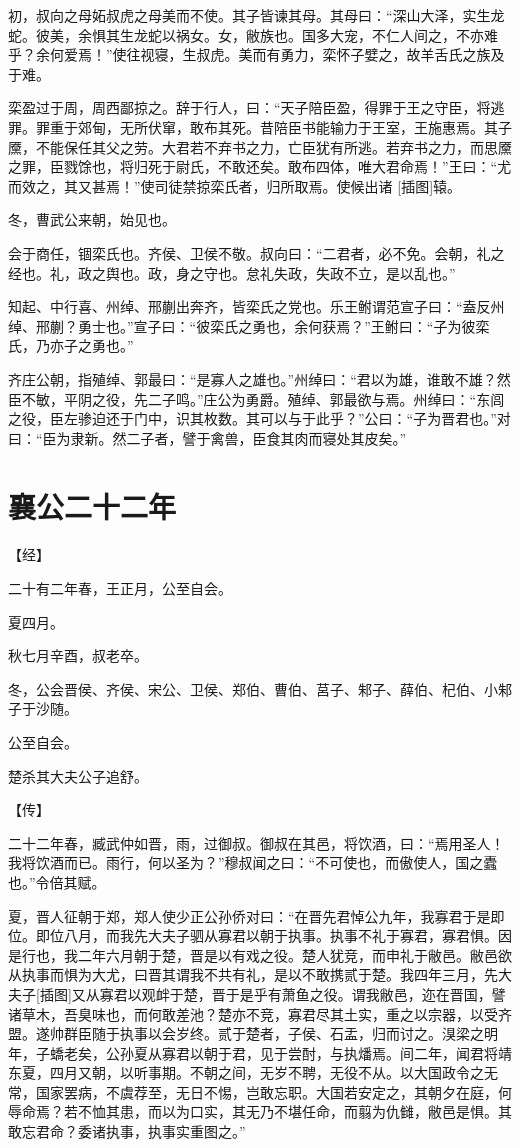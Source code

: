 \documentclass[a4paper,12pt,UTF8,twoside]{ctexbook}
\begin{document}
初，叔向之母妬叔虎之母美而不使。其子皆谏其母。其母曰：“深山大泽，实生龙蛇。彼美，余惧其生龙蛇以祸女。女，敝族也。国多大宠，不仁人间之，不亦难乎？余何爱焉！”使往视寝，生叔虎。美而有勇力，栾怀子嬖之，故羊舌氏之族及于难。

栾盈过于周，周西鄙掠之。辞于行人，曰：“天子陪臣盈，得罪于王之守臣，将逃罪。罪重于郊甸，无所伏窜，敢布其死。昔陪臣书能输力于王室，王施惠焉。其子黡，不能保任其父之劳。大君若不弃书之力，亡臣犹有所逃。若弃书之力，而思黡之罪，臣戮馀也，将归死于尉氏，不敢还矣。敢布四体，唯大君命焉！”王曰：“尤而效之，其又甚焉！”使司徒禁掠栾氏者，归所取焉。使候出诸 [插图]辕。

冬，曹武公来朝，始见也。

会于商任，锢栾氏也。齐侯、卫侯不敬。叔向曰：“二君者，必不免。会朝，礼之经也。礼，政之舆也。政，身之守也。怠礼失政，失政不立，是以乱也。”

知起、中行喜、州绰、邢蒯出奔齐，皆栾氏之党也。乐王鲋谓范宣子曰：“盍反州绰、邢蒯？勇士也。”宣子曰：“彼栾氏之勇也，余何获焉？”王鲋曰：“子为彼栾氏，乃亦子之勇也。”

齐庄公朝，指殖绰、郭最曰：“是寡人之雄也。”州绰曰：“君以为雄，谁敢不雄？然臣不敏，平阴之役，先二子鸣。”庄公为勇爵。殖绰、郭最欲与焉。州绰曰：“东闾之役，臣左骖迫还于门中，识其枚数。其可以与于此乎？”公曰：“子为晋君也。”对曰：“臣为隶新。然二子者，譬于禽兽，臣食其肉而寝处其皮矣。”

\chapter{襄公二十二年}



【经】

二十有二年春，王正月，公至自会。

夏四月。

秋七月辛酉，叔老卒。

冬，公会晋侯、齐侯、宋公、卫侯、郑伯、曹伯、莒子、邾子、薛伯、杞伯、小邾子于沙随。

公至自会。

楚杀其大夫公子追舒。

【传】

二十二年春，臧武仲如晋，雨，过御叔。御叔在其邑，将饮酒，曰：“焉用圣人！我将饮酒而已。雨行，何以圣为？”穆叔闻之曰：“不可使也，而傲使人，国之蠹也。”令倍其赋。

夏，晋人征朝于郑，郑人使少正公孙侨对曰：“在晋先君悼公九年，我寡君于是即位。即位八月，而我先大夫子驷从寡君以朝于执事。执事不礼于寡君，寡君惧。因是行也，我二年六月朝于楚，晋是以有戏之役。楚人犹竞，而申礼于敝邑。敝邑欲从执事而惧为大尤，曰晋其谓我不共有礼，是以不敢携贰于楚。我四年三月，先大夫子[插图]又从寡君以观衅于楚，晋于是乎有萧鱼之役。谓我敝邑，迩在晋国，譬诸草木，吾臭味也，而何敢差池？楚亦不竞，寡君尽其土实，重之以宗器，以受齐盟。遂帅群臣随于执事以会岁终。贰于楚者，子侯、石盂，归而讨之。湨梁之明年，子蟜老矣，公孙夏从寡君以朝于君，见于尝酎，与执燔焉。间二年，闻君将靖东夏，四月又朝，以听事期。不朝之间，无岁不聘，无役不从。以大国政令之无常，国家罢病，不虞荐至，无日不惕，岂敢忘职。大国若安定之，其朝夕在庭，何辱命焉？若不恤其患，而以为口实，其无乃不堪任命，而翦为仇雠，敝邑是惧。其敢忘君命？委诸执事，执事实重图之。”
\end{document}
